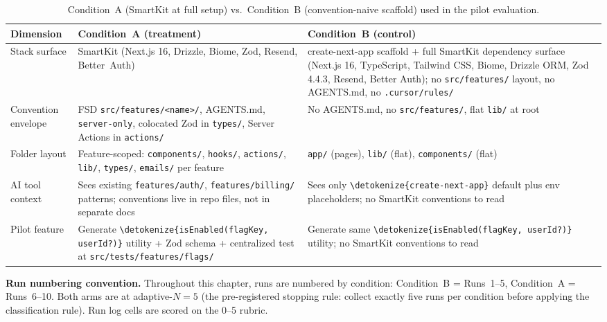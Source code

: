 \documentclass[12pt,a4paper]{report}
\newcommand{\code}[1]{\texttt{\nolinkurl{\detokenize{#1}}}}
\newcommand{\pkg}[1]{\texttt{\nolinkurl{#1}}}
\DeclareRobustCommand{\filename}[1]{\bgroup\urlstyle{tt}\nolinkurl{#1}\egroup}
\begin{document}
\begin{table}[H]
\centering
\small
\renewcommand{\arraystretch}{1.2}
\caption{Condition~A (SmartKit at full setup) vs.\ Condition~B (convention-naive scaffold) used in the pilot evaluation.}
\label{tbl:condition-ab}
\begin{tabular}{@{}p{2.6cm}p{5.6cm}p{5.6cm}@{}}
\toprule
\textbf{Dimension} & \textbf{Condition~A (treatment)} & \textbf{Condition~B (control)} \\
\midrule
Stack surface
  & SmartKit (Next.js 16, Drizzle, Biome, Zod, Resend, Better~Auth)
  & create-next-app scaffold + full SmartKit dependency surface (Next.js 16, TypeScript, Tailwind CSS, Biome, Drizzle ORM, Zod 4.4.3, Resend, Better Auth); no \filename{src/features/} layout, no AGENTS.md, no \filename{.cursor/rules/} \\[4pt]
\midrule
Convention envelope
  & FSD \filename{src/features/<name>/}, AGENTS.md, \pkg{server-only}, colocated Zod in \filename{types/}, Server Actions in \filename{actions/}
  & No AGENTS.md, no \filename{src/features/}, flat \filename{lib/} at root \\[4pt]
\midrule
Folder layout
  & Feature-scoped: \filename{components/}, \filename{hooks/}, \filename{actions/}, \filename{lib/}, \filename{types/}, \filename{emails/} per feature
  & \filename{app/} (pages), \filename{lib/} (flat), \filename{components/} (flat) \\[4pt]
\midrule
AI tool context
  & Sees existing \filename{features/auth/}, \filename{features/billing/} patterns; conventions live in repo files, not in separate docs
  & Sees only \code{create-next-app} default plus env placeholders; no SmartKit conventions to read \\[4pt]
\midrule
Pilot feature
  & Generate \code{isEnabled(flagKey, userId?)} utility + Zod schema + centralized test at \filename{src/tests/features/flags/}
  & Generate same \code{isEnabled(flagKey, userId?)} utility; no SmartKit conventions to read \\[4pt]
\bottomrule
\end{tabular}
\renewcommand{\arraystretch}{1}
\end{table}

\bigskip\noindent\textbf{Run numbering convention.} Throughout this chapter, runs are numbered by condition: Condition~B = Runs~1--5, Condition~A = Runs~6--10. Both arms are at adaptive-$N=5$ (the pre-registered stopping rule: collect exactly five runs per condition before applying the classification rule). Run log cells are scored on the 0--5 rubric.
\end{document}
